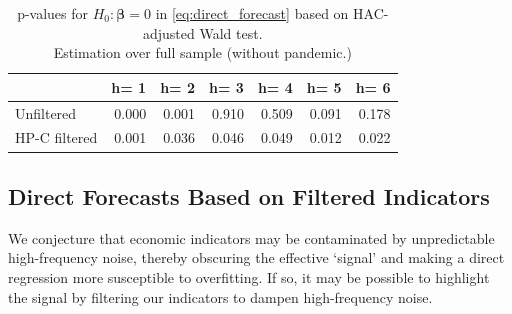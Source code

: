 \documentclass[11pt,a4paper]{article}
\begin{document}
\bigskip
\begin{table}[h]
\centering
\begin{tabular}{lrrrrrr}
  \hline
  & h= 1 & h= 2 & h= 3 & h= 4 & h= 5 & h= 6 \\ 
  \hline
  Unfiltered & 0.000 & 0.001 & 0.910 & 0.509 & 0.091 & 0.178 \\ 
HP-C filtered & 0.001 & 0.036 & 0.046 & 0.049 & 0.012 & 0.022 \\ 
   \hline
\end{tabular}
\caption{p-values for $H_0: \boldsymbol{\beta} = 0$ in \eqref{eq:direct_forecast} based on HAC-adjusted Wald test.\\Estimation over full sample (without pandemic.)} 
\label{tab:pvaluedhp}
\end{table}





\subsection{Direct Forecasts Based on Filtered Indicators}\label{hpdf}

We conjecture that economic indicators may be contaminated by unpredictable high-frequency noise, thereby obscuring the effective `signal' and making a direct regression more susceptible to overfitting. If so, it may be possible to highlight the signal by filtering our indicators to dampen high-frequency noise. 
\end{document}
